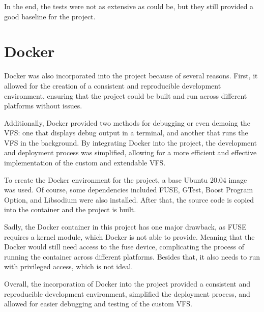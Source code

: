In the end, the tests were not as extensive as could be, but they still provided a good baseline for the project.


\section{Docker}\label{sec:docker}

Docker\cite{docker} was also incorporated into the project because of several reasons.
First, it allowed for the creation of a consistent and reproducible development environment, ensuring that the project could be built and run across different platforms without issues.

Additionally, Docker provided two methods for debugging or even demoing the VFS: one that displays debug output in a terminal, and another that runs the VFS in the background.
By integrating Docker into the project, the development and deployment process was simplified, allowing for a more efficient and effective implementation of the custom and extendable VFS\@.

To create the Docker environment for the project, a base Ubuntu 20.04 image was used.
Of course, some dependencies included FUSE, GTest, Boost Program Option, and Libsodium were also installed.
After that, the source code is copied into the container and the project is built.

Sadly, the Docker container in this project has one major drawback, as FUSE requires a kernel module, which Docker is not able to provide.
Meaning that the Docker would still need access to the fuse device, complicating the process of running the container across different platforms.
Besides that, it also needs to run with privileged access, which is not ideal.

Overall, the incorporation of Docker into the project provided a consistent and reproducible development environment, simplified the deployment process, and allowed for easier debugging and testing of the custom VFS\@.
